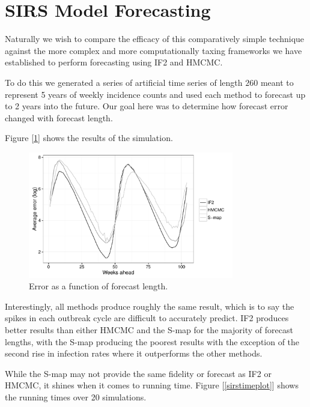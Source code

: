 \section{SIRS Model Forecasting}

	Naturally we wish to compare the efficacy of this comparatively simple technique against the more complex and more computationally taxing frameworks we have established to perform forecasting using IF2 and HMCMC.

	To do this we generated a series of artificial time series of length $260$ meant to represent 5 years of weekly incidence counts and used each method to forecast up to 2 years into the future. Our goal here was to determine how forecast error changed with forecast length.

	Figure [\ref{sirssseplot}] shows the results of the simulation.

	\begin{figure}
        \centering
        \captionsetup{width=.8\linewidth}
        \includegraphics[width=0.8\textwidth]{./images/sseplot.pdf}
        \caption{Error as a function of forecast length. \label{sirssseplot}}
    \end{figure}

    Interestingly, all methods produce roughly the same result, which is to say the spikes in each outbreak cycle are difficult to accurately predict. IF2 produces better results than either HMCMC and the S-map for the majority of forecast lengths, with the S-map producing the poorest results with the exception of the second rise in infection rates where it outperforms the other methods.

    While the S-map may not provide the same fidelity or forecast as IF2 or HMCMC, it shines when it comes to running time. Figure [\ref{sirstimeplot}] shows the running times over 20 simulations.

